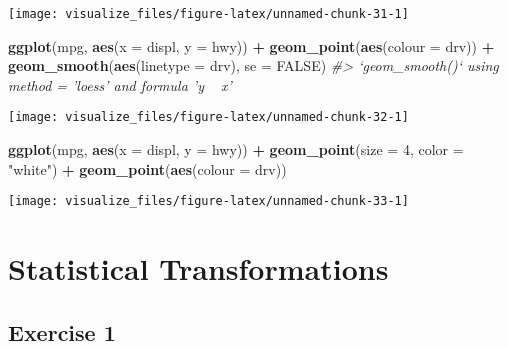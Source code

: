 \documentclass[]{book}
\newenvironment{Shaded}{\begin{snugshade}}{\end{snugshade}}
\newcommand{\CommentTok}[1]{\textcolor[rgb]{0.56,0.35,0.01}{\textit{#1}}}
\newcommand{\DataTypeTok}[1]{\textcolor[rgb]{0.13,0.29,0.53}{#1}}
\newcommand{\DecValTok}[1]{\textcolor[rgb]{0.00,0.00,0.81}{#1}}
\newcommand{\KeywordTok}[1]{\textcolor[rgb]{0.13,0.29,0.53}{\textbf{#1}}}
\newcommand{\NormalTok}[1]{#1}
\newcommand{\OperatorTok}[1]{\textcolor[rgb]{0.81,0.36,0.00}{\textbf{#1}}}
\newcommand{\OtherTok}[1]{\textcolor[rgb]{0.56,0.35,0.01}{#1}}
\newcommand{\StringTok}[1]{\textcolor[rgb]{0.31,0.60,0.02}{#1}}
\theoremstyle{plain}
\theoremstyle{remark}
\theoremstyle{definition}
\theoremstyle{definition}
\theoremstyle{definition}
\theoremstyle{remark}
\begin{document}
\begin{center}\texttt{[image: visualize\_files/figure-latex/unnamed-chunk-31-1]} \end{center}

\begin{Shaded}
\begin{Highlighting}[]
\KeywordTok{ggplot}\NormalTok{(mpg, }\KeywordTok{aes}\NormalTok{(}\DataTypeTok{x =}\NormalTok{ displ, }\DataTypeTok{y =}\NormalTok{ hwy)) }\OperatorTok{+}
\StringTok{  }\KeywordTok{geom_point}\NormalTok{(}\KeywordTok{aes}\NormalTok{(}\DataTypeTok{colour =}\NormalTok{ drv)) }\OperatorTok{+}
\StringTok{  }\KeywordTok{geom_smooth}\NormalTok{(}\KeywordTok{aes}\NormalTok{(}\DataTypeTok{linetype =}\NormalTok{ drv), }\DataTypeTok{se =} \OtherTok{FALSE}\NormalTok{)}
\CommentTok{#> `geom_smooth()` using method = 'loess' and formula 'y ~ x'}
\end{Highlighting}
\end{Shaded}

\begin{center}\texttt{[image: visualize\_files/figure-latex/unnamed-chunk-32-1]} \end{center}

\begin{Shaded}
\begin{Highlighting}[]
\KeywordTok{ggplot}\NormalTok{(mpg, }\KeywordTok{aes}\NormalTok{(}\DataTypeTok{x =}\NormalTok{ displ, }\DataTypeTok{y =}\NormalTok{ hwy)) }\OperatorTok{+}
\StringTok{   }\KeywordTok{geom_point}\NormalTok{(}\DataTypeTok{size =} \DecValTok{4}\NormalTok{, }\DataTypeTok{color =} \StringTok{"white"}\NormalTok{) }\OperatorTok{+}
\StringTok{   }\KeywordTok{geom_point}\NormalTok{(}\KeywordTok{aes}\NormalTok{(}\DataTypeTok{colour =}\NormalTok{ drv))}
\end{Highlighting}
\end{Shaded}

\begin{center}\texttt{[image: visualize\_files/figure-latex/unnamed-chunk-33-1]} \end{center}

\hypertarget{statistical-transformations}{%
\section{Statistical
Transformations}\label{statistical-transformations}}

\hypertarget{exercise-1-3}{%
\subsection{Exercise 1}\label{exercise-1-3}}
\end{document}
